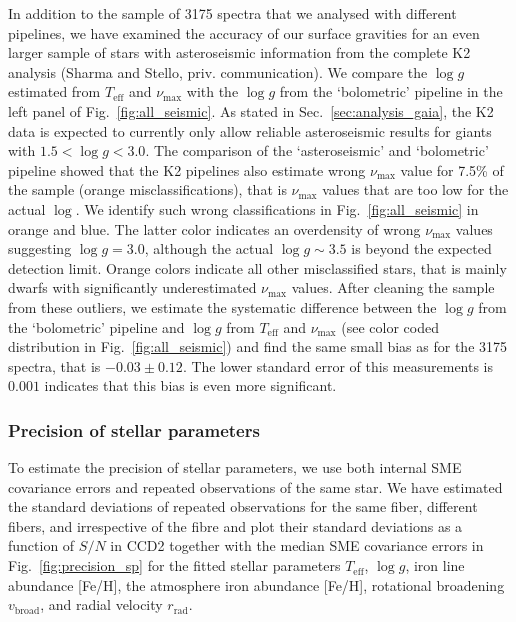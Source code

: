 \documentclass[fleqn,usenatbib,useAMS]{mnras}
\begin{document}
In addition to the sample of 3175 spectra that we analysed with different pipelines, we have examined the accuracy of our surface gravities for an even larger sample of stars with asteroseismic information from the complete K2 analysis (Sharma and Stello, priv. communication). We compare the $\log g$ estimated from $T_\text{eff}$ and $\nu_\text{max}$ with the $\log g$ from the `bolometric' pipeline in the left panel of Fig.~\ref{fig:all_seismic}. As stated in Sec.~\ref{sec:analysis_gaia}, the K2 data is expected to currently only allow reliable asteroseismic results for giants with $1.5 < \log g < 3.0$. The comparison of the `asteroseismic' and `bolometric' pipeline showed that the K2 pipelines also estimate wrong $\nu_\text{max}$ value for 7.5\% of the sample (orange misclassifications), that is $\nu_\text{max}$ values that are too low for the actual $\log $. We identify such wrong classifications in Fig.~\ref{fig:all_seismic} in orange and blue. The latter color indicates an overdensity of wrong $\nu_\text{max}$ values suggesting $\log g = 3.0$, although the actual $\log g \sim 3.5$ is beyond the expected detection limit. Orange colors indicate all other misclassified stars, that is mainly dwarfs with significantly underestimated $\nu_\text{max}$ values. After cleaning the sample from these outliers, we estimate the systematic difference between the $\log g$ from the `bolometric' pipeline and $\log g$ from $T_\text{eff}$ and $\nu_\text{max}$ (see color coded distribution in Fig.~\ref{fig:all_seismic}) and find the same small bias as for the 3175 spectra, that is $-0.03 \pm 0.12$. The lower standard error of this measurements is $0.001$ indicates that this bias is even more significant.

\subsubsection{Precision of stellar parameters}

To estimate the precision of stellar parameters, we use both internal SME covariance errors and repeated observations of the same star. We have estimated the standard deviations of repeated observations for the same fiber, different fibers, and irrespective of the fibre and plot their standard deviations as a function of $S/N$ in CCD2 together with the median SME covariance errors in Fig.~\ref{fig:precision_sp} for the fitted stellar parameters $T_\text{eff}$, $\log g$, iron line abundance [Fe/H], the atmosphere iron abundance [Fe/H], rotational broadening $v_\text{broad}$, and radial velocity $r_\text{rad}$. 
\end{document}
